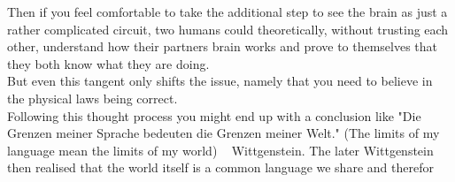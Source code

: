 Then if you feel comfortable to take the additional step to see the brain as just a rather complicated circuit, two humans could theoretically, without trusting each other, understand how their partners brain works and prove to themselves that they both know what they are doing. \\
But even this tangent only shifts the issue, namely that you need to believe in the physical laws being correct. \\

Following this thought process you might end up with a conclusion like "Die Grenzen meiner Sprache bedeuten die Grenzen meiner Welt." (The limits of my language mean the limits of my world) ~ Wittgenstein. The later Wittgenstein then realised that the world itself is a common language we share and therefor


